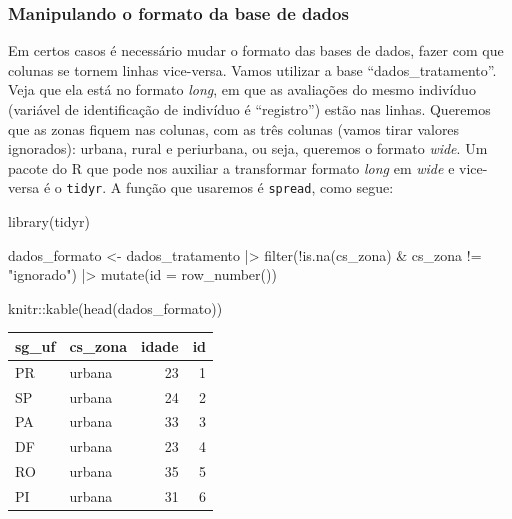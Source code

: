 \documentclass[
  letterpaper,
  DIV=11,
  numbers=noendperiod]{scrreprt}
\newenvironment{Shaded}{\begin{snugshade}}{\end{snugshade}}
\newcommand{\AttributeTok}[1]{\textcolor[rgb]{0.40,0.45,0.13}{#1}}
\newcommand{\FunctionTok}[1]{\textcolor[rgb]{0.28,0.35,0.67}{#1}}
\newcommand{\NormalTok}[1]{\textcolor[rgb]{0.00,0.23,0.31}{#1}}
\newcommand{\OtherTok}[1]{\textcolor[rgb]{0.00,0.23,0.31}{#1}}
\newcommand{\SpecialCharTok}[1]{\textcolor[rgb]{0.37,0.37,0.37}{#1}}
\newcommand{\StringTok}[1]{\textcolor[rgb]{0.13,0.47,0.30}{#1}}
\begin{document}
\hypertarget{manipulando-o-formato-da-base-de-dados}{%
\subsubsection{Manipulando o formato da base de
dados}\label{manipulando-o-formato-da-base-de-dados}}

Em certos casos é necessário mudar o formato das bases de dados, fazer
com que colunas se tornem linhas vice-versa. Vamos utilizar a base
``dados\_tratamento''. Veja que ela está no formato \emph{long}, em que
as avaliações do mesmo indivíduo (variável de identificação de indivíduo
é ``registro'') estão nas linhas. Queremos que as zonas fiquem nas
colunas, com as três colunas (vamos tirar valores ignorados): urbana,
rural e periurbana, ou seja, queremos o formato \emph{wide}. Um pacote
do R que pode nos auxiliar a transformar formato \emph{long} em
\emph{wide} e vice-versa é o \texttt{tidyr}. A função que usaremos é
\texttt{spread}, como segue:

\begin{Shaded}
\begin{Highlighting}[]
\FunctionTok{library}\NormalTok{(tidyr)}

\NormalTok{dados\_formato }\OtherTok{\textless{}{-}}\NormalTok{ dados\_tratamento }\SpecialCharTok{|\textgreater{}} 
  \FunctionTok{filter}\NormalTok{(}\SpecialCharTok{!}\FunctionTok{is.na}\NormalTok{(cs\_zona) }\SpecialCharTok{\&}\NormalTok{ cs\_zona }\SpecialCharTok{!=} \StringTok{"ignorado"}\NormalTok{) }\SpecialCharTok{|\textgreater{}} 
  \FunctionTok{mutate}\NormalTok{(}\AttributeTok{id =} \FunctionTok{row\_number}\NormalTok{())}

\NormalTok{knitr}\SpecialCharTok{::}\FunctionTok{kable}\NormalTok{(}\FunctionTok{head}\NormalTok{(dados\_formato))}
\end{Highlighting}
\end{Shaded}

\begin{longtable}[]{@{}llrr@{}}
\toprule()
sg\_uf & cs\_zona & idade & id \\
\midrule()
\endhead
PR & urbana & 23 & 1 \\
SP & urbana & 24 & 2 \\
PA & urbana & 33 & 3 \\
DF & urbana & 23 & 4 \\
RO & urbana & 35 & 5 \\
PI & urbana & 31 & 6 \\
\bottomrule()
\end{longtable}
\end{document}
